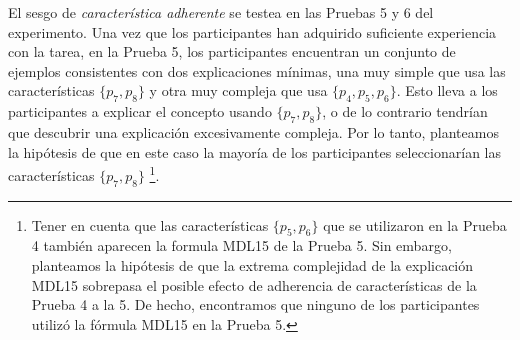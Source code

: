 \begin{hyp}\label{Hip:FeatureBiasStickiness}
El sesgo de \textit{característica adherente} se testea en las Pruebas 5 y 6 del experimento. Una vez que los participantes han adquirido suficiente experiencia con la tarea, en la Prueba 5, los participantes encuentran un conjunto de ejemplos consistentes con dos explicaciones mínimas, una muy simple que usa las características $\{p_7, p_8 \}$ y otra muy compleja que usa $\{p_4, p_5, p_6 \}$. Esto lleva a los participantes a explicar el concepto usando $\{p_7, p_8 \} $, o de lo contrario tendrían que descubrir una explicación excesivamente compleja. Por lo tanto, planteamos la hipótesis de que en este caso la mayoría de los participantes seleccionarían las características $\{p_7, p_8 \}$ \footnote{Tener en cuenta que las características $\{p_5, p_6 \}$ que se utilizaron en la Prueba 4 también aparecen la formula MDL15 de la Prueba 5. Sin embargo, planteamos la hipótesis de que la extrema complejidad de la explicación MDL15 sobrepasa el posible efecto de adherencia de características de la Prueba 4 a la 5. De hecho, encontramos que ninguno de los participantes utilizó la fórmula MDL15 en la Prueba 5.}.
    

\end{hyp}
